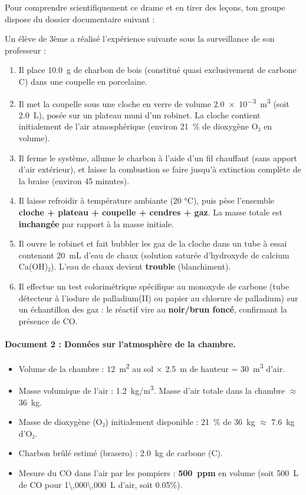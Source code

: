 \documentclass[11pt]{article}
\begin{document}
Pour comprendre scientifiquement ce drame et en tirer des leçons, ton groupe dispose du dossier documentaire suivant :

\begin{experience}
Un élève de 3ème a réalisé l'expérience suivante sous la surveillance de son professeur :
\begin{enumerate}
    \item Il place \SI{10,0}{g} de charbon de bois (constitué quasi exclusivement de carbone C) dans une coupelle en porcelaine.
    \item Il met la coupelle sous une cloche en verre de volume \SI{2,0e-3}{\cubic\meter} (soit \SI{2,0}{L}), posée sur un plateau muni d'un robinet. La cloche contient initialement de l'air atmosphérique (environ \SI{21}{\percent} de dioxygène O₂ en volume).
    \item Il ferme le système, allume le charbon à l'aide d'un fil chauffant (sans apport d'air extérieur), et laisse la combustion se faire jusqu'à extinction complète de la braise (environ 45 minutes).
    \item Il laisse refroidir à température ambiante (20 °C), puis pèse l'ensemble \textbf{cloche + plateau + coupelle + cendres + gaz}. La masse totale est \textbf{inchangée} par rapport à la masse initiale.
    \item Il ouvre le robinet et fait bubbler les gaz de la cloche dans un tube à essai contenant \SI{20}{mL} d'eau de chaux (solution saturée d'hydroxyde de calcium Ca(OH)₂). L'eau de chaux devient \textbf{trouble} (blanchiment).
    \item Il effectue un test colorimétrique spécifique au monoxyde de carbone (tube détecteur à l'iodure de palladium(II) ou papier au chlorure de palladium) sur un échantillon des gaz : le réactif vire au \textbf{noir/brun foncé}, confirmant la présence de CO.
\end{enumerate}
\end{experience}

\paragraph{Document 2 : Données sur l'atmosphère de la chambre.}
\begin{itemize}
    \item Volume de la chambre : \SI{12}{\square\meter} au sol $\times$ \SI{2,5}{m} de hauteur = \SI{30}{\cubic\meter} d'air.
    \item Masse volumique de l'air : \SI{1,2}{kg/m^3}. Masse d'air totale dans la chambre $\approx$ \SI{36}{kg}.
    \item Masse de dioxygène (O₂) initialement disponible : \SI{21}{\percent} de \SI{36}{kg} $\approx$ \SI{7,6}{kg} d'O₂.
    \item Charbon brûlé estimé (brasero) : \SI{2,0}{kg} de carbone (C).
    \item Mesure du CO dans l'air par les pompiers : \textbf{\num{500}~ppm} en volume (soit \SI{500}{L} de CO pour \SI{1\,000\,000}{L} d'air, soit \num{0,05}\%).
\end{itemize}
\end{document}

